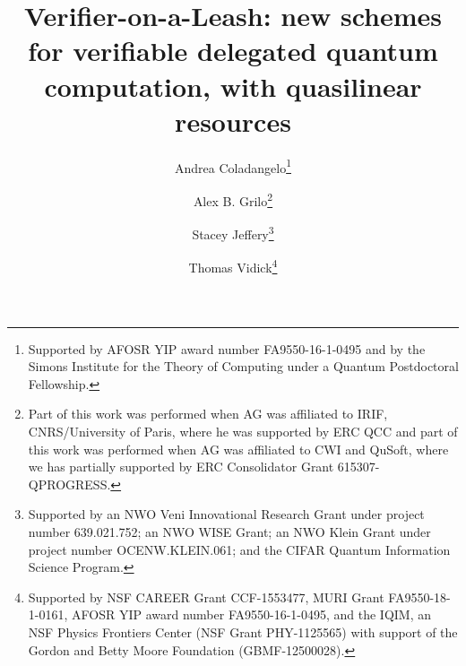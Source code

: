 \begin{frontmatter}%


\title{Verifier-on-a-Leash: new schemes for verifiable delegated quantum computation, with quasilinear resources}




\author[coladangelo]{Andrea Coladangelo\thanks{Supported by AFOSR YIP award number FA9550-16-1-0495 and by the Simons Institute for the Theory of Computing under a Quantum Postdoctoral Fellowship.}}
\author[grilo]{Alex B. Grilo\thanks{Part of this work was performed when AG was affiliated to IRIF, CNRS/University of Paris, where he was supported by ERC QCC and part of this work was performed when AG was affiliated to CWI and QuSoft, where we has partially supported by ERC Consolidator Grant 615307-QPROGRESS.}}
\author[jeffery]{Stacey Jeffery\thanks{Supported by an NWO Veni Innovational Research Grant under project number 639.021.752; an NWO WISE Grant; an NWO Klein Grant under project number OCENW.KLEIN.061;
and the CIFAR Quantum Information Science Program.
}}
\author[vidick]{Thomas Vidick\thanks{Supported by NSF CAREER Grant CCF-1553477, MURI Grant FA9550-18-1-0161, AFOSR YIP award number FA9550-16-1-0495, and the IQIM, an NSF Physics Frontiers Center (NSF Grant PHY-1125565) with support of the Gordon and Betty Moore Foundation (GBMF-12500028).}}

\begin{abstract}

\end{abstract}


\end{frontmatter}
